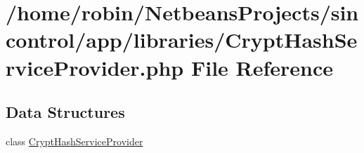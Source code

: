 \hypertarget{_crypt_hash_service_provider_8php}{}\section{/home/robin/\+Netbeans\+Projects/sincontrol/app/libraries/\+Crypt\+Hash\+Service\+Provider.php File Reference}
\label{_crypt_hash_service_provider_8php}
\subsection*{Data Structures}
\begin{DoxyCompactItemize}
\item 
class \hyperlink{class_crypt_hash_service_provider}{Crypt\+Hash\+Service\+Provider}
\end{DoxyCompactItemize}
